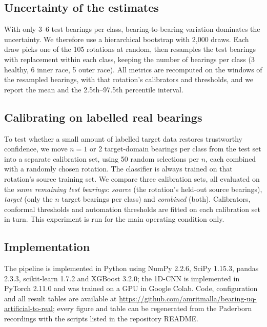 \subsection{Uncertainty of the estimates}
\label{sec:bootstrap}

With only 3--6 test bearings per class, bearing-to-bearing variation dominates the uncertainty. We therefore use a
hierarchical bootstrap with 2{,}000 draws. Each draw picks one of the 105 rotations at random, then resamples the test
bearings with replacement within each class, keeping the number of bearings per class (3 healthy, 6 inner race,
5 outer race). All metrics are recomputed on the windows of the resampled bearings, with that rotation's calibrators
and thresholds, and we report the mean and the
2.5th--97.5th percentile interval.

\subsection{Calibrating on labelled real bearings}
\label{sec:realcal}

To test whether a small amount of labelled target data restores trustworthy confidence, we move $n = 1$ or 2
target-domain bearings per class from the test set into a separate calibration set, using 50 random selections per
$n$, each combined with a randomly chosen rotation. The classifier is always trained on that rotation's source
training set. We compare three calibration sets, all evaluated on the \emph{same remaining test bearings}:
\emph{source} (the rotation's held-out source bearings), \emph{target} (only the $n$ target bearings per class) and
\emph{combined} (both). Calibrators, conformal thresholds and automation thresholds are fitted on each calibration set
in turn. This experiment is run for the main operating condition only.

\subsection{Implementation}

The pipeline is implemented in Python using NumPy 2.2.6, SciPy 1.15.3, pandas 2.3.3, scikit-learn 1.7.2 and XGBoost
3.2.0; the 1D-CNN is implemented in PyTorch 2.11.0 and was trained on a GPU in Google Colab. Code,
configuration and all result tables are available at \url{https://github.com/amritmalla/bearing-uq-artificial-to-real}; every figure and table can be regenerated
from the Paderborn recordings with the scripts listed in the repository README.
